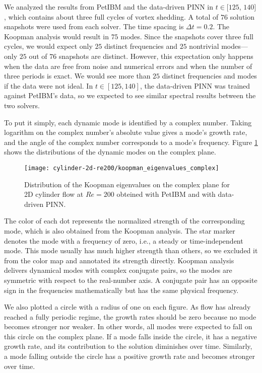 We analyzed the results from PetIBM and the data-driven PINN in $t\in$$[125$, $140]$, which contains about three full cycles of vortex shedding.
A total of $76$ solution snapshots were used from each solver.
The time spacing is $\Delta t = 0.2$.
The Koopman analysis would result in $75$ modes.
Since the snapshots cover three full cycles, we would expect only $25$ distinct frequencies and $25$ nontrivial modes---only $25$ out of $76$ snapshots are distinct.
However, this expectation only happens when the data are free from noise and numerical errors and when the number of three periods is exact.
We would see more than $25$ distinct frequencies and modes if the data were not ideal.
In $t \in [125, 140]$, the data-driven PINN was trained against PetIBM's data, so we expected to see similar spectral results between the two solvers.

To put it simply, each dynamic mode is identified by a complex number.
Taking logarithm on the complex number's absolute value gives a mode's growth rate, and the angle of the complex number corresponds to a mode's frequency.
Figure \ref{fig:cylinder-re200-koopman-eig-dist} shows the distributions of the dynamic modes on the complex plane.
\begin{figure}
    \centering%
    \texttt{[image: cylinder-2d-re200/koopman\_eigenvalues\_complex]}%
    \caption{%
        Distribution of the Koopman eigenvalues on the complex plane for 2D cylinder flow at $Re=\num{200}$ obteined with PetIBM and with data-driven PINN.
    }
    \label{fig:cylinder-re200-koopman-eig-dist}%
\end{figure}
The color of each dot represents the normalized strength of the corresponding mode, which is also obtained from the Koopman analysis.
The star marker denotes the mode with a frequency of zero, i.e., a steady or time-independent mode.
This mode usually has much higher strength than others, so we excluded it from the color map and annotated its strength directly.
Koopman analysis delivers dynamical modes with complex conjugate pairs, so the modes are symmetric with respect to the real-number axis. 
A conjugate pair has an opposite sign in the frequencies mathematically but has the same physical frequency.

We also plotted a circle with a radius of one on each figure.
As flow has already reached a fully periodic regime, the growth rates should be zero because no mode becomes stronger nor weaker.
In other words, all modes were expected to fall on this circle on the complex plane.
If a mode falls inside the circle, it has a negative growth rate, and its contribution to the solution diminishes over time.
Similarly, a mode falling outside the circle has a positive growth rate and becomes stronger over time.

